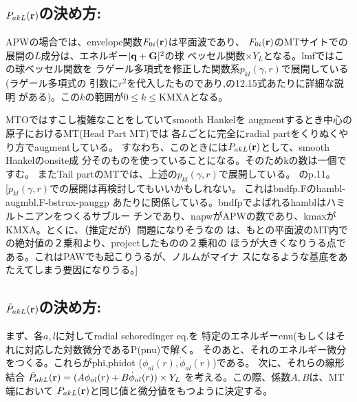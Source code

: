 \documentclass[twocolumn,showpacs,preprintnumbers,amsmath,amssymb,floatfix]{revtex4-1}
\newcommand{\bfq}{{\bf q}}
\newcommand{\bfr}{{\bf r}}
\newcommand{\bfG}{{\bf G}}
\newcommand{\bfR}{{\bf R}}
\def\smh{smHankel}
\def\smh{smHankel}
\begin{document}


\subsection{\bf ${P}_{akL}(\bfr)$の決め方:}
APWの場合\cite{soler89}では、envelope関数$F_{0i}(\bfr)$は平面波であり、
$F_{0i}(\bfr)$のMTサイトでの展開の$L$成分は、エネルギー$|\bfq+\bfG|^2$の球
ベッセル関数$\times Y_L$となる。lmfではこの球ベッセル関数を
ラゲール多項式を修正した関数系$p_{kl}(\gamma,r)$で展開している(ラゲール多項式の
引数に$r^2$を代入したものであり,\cite{Bott98}の12.15式あたりに詳細な説明
がある)。この$k$の範囲が$0\le k \le$KMXAとなる。

MTOではすこし複雑なことをしていてsmooth Hankelを
augmentするとき中心の原子におけるMT(Head Part MT)では
各$L$ごとに完全にradial partをくりぬくやり方でaugmentしている。
すなわち、このときには${P}_{akL}(\bfr)$として、smooth Hankelのonsite成
分そのものを使っていることになる。そのためkの数は一個ですむ。
またTail partのMTでは、上述の$p_{kl}(\gamma,r)$で展開している。
\cite{lmfchap}のp.11。\\


[$p_{kl}(\gamma,r)$での展開は再検討してもいいかもしれない。
これはbndfp.Fのhambl-augmbl.F-bstrux-pauggp
あたりに関係している。bndfpでよばれるhamblはハミルトニアンをつくるサブルー
チンであり、napwがAPWの数であり、kmaxがKMXA。とくに、（推定だが）問題になりそうなの
は、もとの平面波のMT内での絶対値の２乗和より、projectしたものの２乗和の
ほうが大きくなりうる点である。これはPAWでも起こりうるが、ノルムがマイナ
スになるような基底をあたえてしまう要因になりうる。]


\subsection{\bf $\tilde{P}_{akL} (\bfr)$の決め方:}
まず、各$a,l$に対してradial schoredinger eq.を
特定のエネルギーenu(もしくはそれに対応した対数微分であるP(pnu)で解く。
そのあと、それのエネルギー微分をつくる。これらがphi,phidot
($\phi_{al}(r),\dot{\phi}_{al}(r)$)である。
次に、それらの線形結合
$\tilde{P}_{akL}(\bfr)=(A\phi_{al}(r)+ B \dot{\phi}_{al}(r))\times Y_L$
を考える。この際、係数$A,B$は、MT端において
${P}_{akL}(\bfr)$と同じ値と微分値をもつように決定する。
\end{document}
